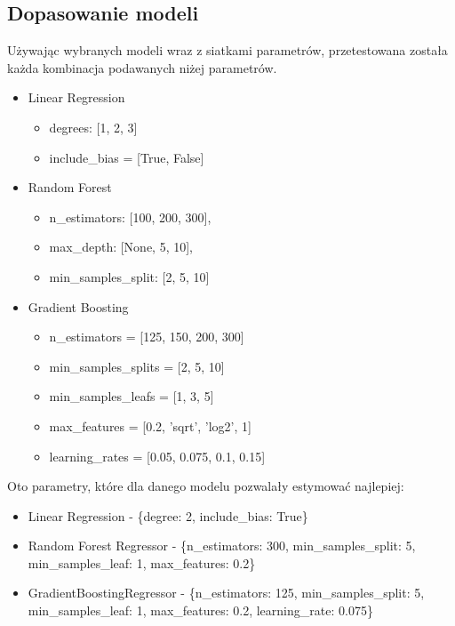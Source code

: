 \documentclass{article}
\begin{document}
\subsection{Dopasowanie modeli}
Używając wybranych modeli wraz z siatkami parametrów, przetestowana została każda kombinacja podawanych niżej parametrów.
\begin{itemize}
    \item Linear Regression
    \begin{itemize}
        \item degrees: [1, 2, 3]
        \item include\_bias = [True, False]
    \end{itemize}
    
    \item Random Forest
    \begin{itemize}
        \item n\_estimators: [100, 200, 300],
        \item max\_depth: [None, 5, 10],
        \item min\_samples\_split: [2, 5, 10] 
    \end{itemize}

    \item Gradient Boosting
    \begin{itemize}
        \item n\_estimators = [125, 150, 200, 300]
        \item min\_samples\_splits = [2, 5, 10]
        \item min\_samples\_leafs = [1, 3, 5]
        \item max\_features = [0.2, 'sqrt', 'log2', 1]
        \item learning\_rates = [0.05, 0.075, 0.1, 0.15]    
    \end{itemize}
\end{itemize}
Oto parametry, które dla danego modelu pozwalały estymować najlepiej:
\begin{itemize}
    \item Linear Regression - \{degree: 2, include\_bias: True\}
    \item Random Forest Regressor - \{n\_estimators: 300, min\_samples\_split: 5, min\_samples\_leaf: 1, max\_features: 0.2\}
    \item GradientBoostingRegressor - \{n\_estimators: 125, min\_samples\_split: 5, min\_samples\_leaf: 1, max\_features: 0.2, learning\_rate: 0.075\}
\end{itemize}
\end{document}
